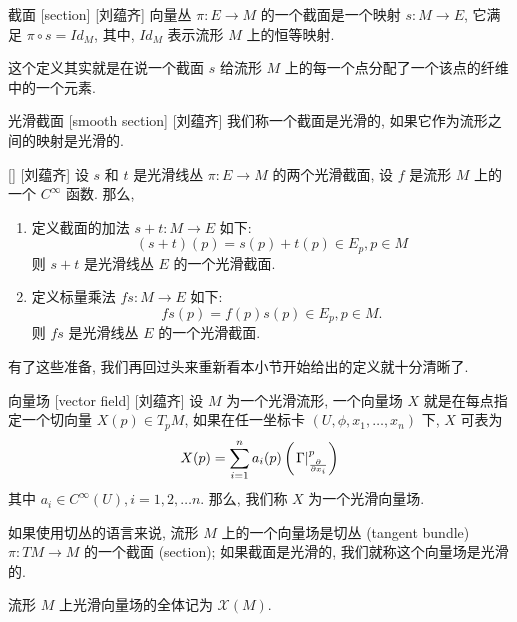\documentclass[UTF8]{ctexart}
\begin{document}
        \begin{dfn}
            []
            {截面}
            [section]
            [刘蕴齐]
            向量丛 \(\pi: E \to M\) 的一个截面是一个映射 \(s: M \to E\), 它满足 \(\pi \circ s = Id_{M}\), 其中,  \(Id_{M}\) 表示流形 \(M\) 上的恒等映射. 
        \end{dfn}

        \begin{rmk}
            []
            这个定义其实就是在说一个截面 \(s\) 给流形 \(M\) 上的每一个点分配了一个该点的纤维中的一个元素. 
        \end{rmk}

        \begin{dfn}
            []
            {光滑截面}
            [smooth section]
            [刘蕴齐]
            我们称一个截面是光滑的, 如果它作为流形之间的映射是光滑的. 
        \end{dfn}

        \begin{ppt}
            []
            {}
            []
            [刘蕴齐]
            设 \(s\) 和 \(t\) 是光滑线丛 \(\pi: E \to M\) 的两个光滑截面, 设 \(f\) 是流形 \(M\) 上的一个 \(C^{\infty}\) 函数. 那么,
            \begin{enumerate}
                \item 定义截面的加法 \(s + t: M \to E\) 如下:
                \[
                    (s + t)(p) = s(p) + t(p) \in E_p, p \in M
                \]
                则 \(s + t\) 是光滑线丛 \(E\) 的一个光滑截面. 
                \item 定义标量乘法 \(f s: M \to E\) 如下:
                \[
                    fs(p) = f(p)s(p) \in E_p, p \in M.
                \]
                则 \(f s\) 是光滑线丛 \(E\) 的一个光滑截面. 
            \end{enumerate}
        \end{ppt}
        有了这些准备, 我们再回过头来重新看本小节开始给出的定义就十分清晰了. 

        \begin{dfn}
            []
            {向量场}
            [vector field]
            [刘蕴齐]
            设 \(M\) 为一个光滑流形, 一个向量场 \(X\) 就是在每点指定一个切向量 \(X(p) \in T_p M\), 如果在任一坐标卡 \((U,\phi,x_1,\dots,x_n)\) 下,  \(X\) 可表为
            \[
            X(p)=\sum_{i=1}^{n} a_{i}(p)\left(\diff{\frac{\partial}{\partial x_{i}}}{p}{}\right)
            \]
            其中 \(a_i \in C^{\infty}(U), i = 1,2, \dots n\). 那么, 我们称  \(X\)  为一个光滑向量场. 
            
            如果使用切丛的语言来说, 流形 \(M\) 上的一个向量场是切丛 (tangent bundle)  \(\pi: TM \to M\) 的一个截面 (section); 如果截面是光滑的, 我们就称这个向量场是光滑的. 
            
            流形  \(M\)  上光滑向量场的全体记为 \(\mathcal{X}(M)\).
        \end{dfn}
\end{document}
